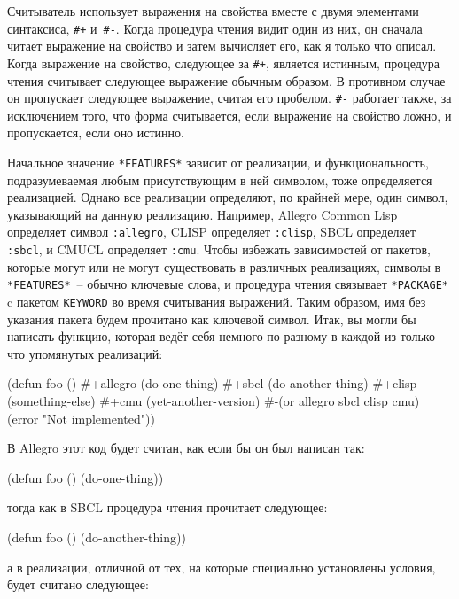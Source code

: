 Считыватель использует выражения на свойства вместе с двумя элементами синтаксиса,
\lstinline!#+! и~\lstinline!#-!. Когда процедура чтения видит один из них, он сначала читает
выражение на свойство и затем вычисляет его, как я только что описал. Когда выражение на
свойство, следующее за \lstinline!#+!, является истинным, процедура чтения считывает следующее
выражение обычным образом. В противном случае он пропускает следующее выражение, считая
его пробелом. \lstinline!#-! работает также, за исключением того, что форма считывается,
если выражение на свойство ложно, и пропускается, если оно истинно.

Начальное значение \lstinline{*FEATURES*} зависит от реализации, и функциональность,
подразумеваемая любым присутствующим в ней символом, тоже определяется реализацией. Однако
все реализации определяют, по крайней мере, один символ, указывающий на данную реализацию.
Например, Allegro Common Lisp определяет символ \lstinline{:allegro}, CLISP определяет
\lstinline{:clisp}, SBCL определяет \lstinline{:sbcl}, и CMUCL определяет
\lstinline{:cmu}.  Чтобы избежать зависимостей от пакетов, которые могут или не могут
существовать в различных реализациях, символы в \lstinline{*FEATURES*}~-- обычно ключевые
слова, и процедура чтения связывает \lstinline{*PACKAGE*} c пакетом \lstinline{KEYWORD} во
время считывания выражений. Таким образом, имя без указания пакета будем прочитано как
ключевой символ. Итак, вы могли бы написать функцию, которая ведёт себя немного по-разному
в каждой из только что упомянутых реализаций:

\begin{myverb}
  (defun foo ()
    #+allegro (do-one-thing)
    #+sbcl (do-another-thing)
    #+clisp (something-else)
    #+cmu (yet-another-version)
    #-(or allegro sbcl clisp cmu) (error "Not implemented"))
\end{myverb}

\noindent{}В Allegro этот код будет считан, как если бы он был написан так:

\begin{myverb}
  (defun foo ()
    (do-one-thing))
\end{myverb}

\noindent{}тогда как в SBCL процедура чтения прочитает следующее:

\begin{myverb}
  (defun foo ()
    (do-another-thing))
\end{myverb}

\noindent{}а в реализации, отличной от тех, на которые специально установлены условия, будет считано
следующее:

